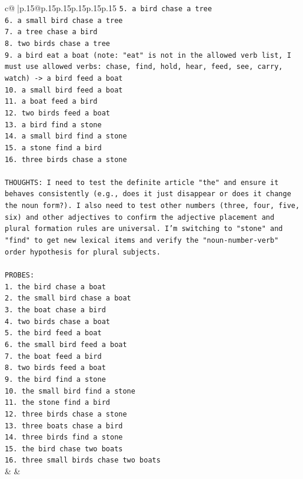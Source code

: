 \documentclass{article}
\begin{document}
{\begin{supertabular}{c@{$\;$}|p{.15\linewidth}@{}p{.15\linewidth}p{.15\linewidth}p{.15\linewidth}p{.15\linewidth}p{.15\linewidth}}
{{{\texttt{5. a bird chase a tree} \\
\texttt{6. a small bird chase a tree} \\
\texttt{7. a tree chase a bird} \\
\texttt{8. two birds chase a tree} \\
\texttt{9. a bird eat a boat (note: "eat" is not in the allowed verb list, I must use allowed verbs: chase, find, hold, hear, feed, see, carry, watch) {-}> a bird feed a boat} \\
\texttt{10. a small bird feed a boat} \\
\texttt{11. a boat feed a bird} \\
\texttt{12. two birds feed a boat} \\
\texttt{13. a bird find a stone} \\
\texttt{14. a small bird find a stone} \\
\texttt{15. a stone find a bird} \\
\texttt{16. three birds chase a stone} \\
\\ 
\texttt{THOUGHTS: I need to test the definite article "the" and ensure it behaves consistently (e.g., does it just disappear or does it change the noun form?). I also need to test other numbers (three, four, five, six) and other adjectives to confirm the adjective placement and plural formation rules are universal. I'm switching to "stone" and "find" to get new lexical items and verify the "noun{-}number{-}verb" order hypothesis for plural subjects.} \\
\\ 
\texttt{PROBES:} \\
\texttt{1. the bird chase a boat} \\
\texttt{2. the small bird chase a boat} \\
\texttt{3. the boat chase a bird} \\
\texttt{4. two birds chase a boat} \\
\texttt{5. the bird feed a boat} \\
\texttt{6. the small bird feed a boat} \\
\texttt{7. the boat feed a bird} \\
\texttt{8. two birds feed a boat} \\
\texttt{9. the bird find a stone} \\
\texttt{10. the small bird find a stone} \\
\texttt{11. the stone find a bird} \\
\texttt{12. three birds chase a stone} \\
\texttt{13. three boats chase a bird} \\
\texttt{14. three birds find a stone} \\
\texttt{15. the bird chase two boats} \\
\texttt{16. three small birds chase two boats} \\
            }
        }
    }
    & & \\ \\


\end{supertabular}}
\end{document}
